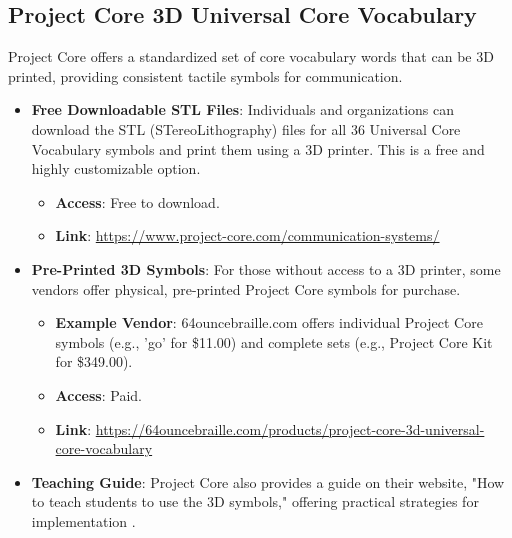 \subsection{Project Core 3D Universal Core Vocabulary}
Project Core offers a standardized set of core vocabulary words that can be 3D printed, providing consistent tactile symbols for communication.
\begin{itemize}
    \item \textbf{Free Downloadable STL Files}: Individuals and organizations can download the STL (STereoLithography) files for all 36 Universal Core Vocabulary symbols and print them using a 3D printer. This is a free and highly customizable option.
    \begin{itemize}
        \item \textbf{Access}: Free to download.
        \item \textbf{Link}: \url{https://www.project-core.com/communication-systems/}
    \end{itemize}
    \item \textbf{Pre-Printed 3D Symbols}: For those without access to a 3D printer, some vendors offer physical, pre-printed Project Core symbols for purchase.
    \begin{itemize}
        \item \textbf{Example Vendor}: 64ouncebraille.com offers individual Project Core symbols (e.g., 'go' for \$11.00) and complete sets (e.g., Project Core Kit for \$349.00).
        \item \textbf{Access}: Paid.
        \item \textbf{Link}: \url{https://64ouncebraille.com/products/project-core-3d-universal-core-vocabulary}
    \end{itemize}
    \item \textbf{Teaching Guide}: Project Core also provides a guide on their website, "How to teach students to use the 3D symbols," offering practical strategies for implementation  \cite{ProjectCore_Teaching}.
\end{itemize}

